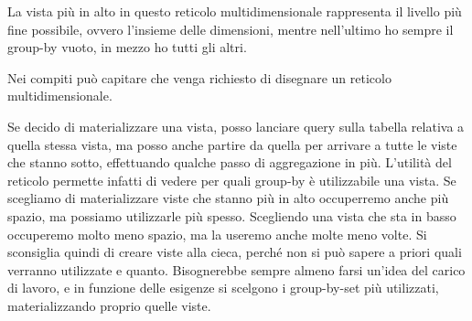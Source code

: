 \noindent La vista più in alto in questo reticolo multidimensionale rappresenta il livello più fine possibile, ovvero l'insieme delle dimensioni, mentre nell'ultimo ho sempre il group-by vuoto, in mezzo ho tutti gli altri.\newline
\begin{warn}
	Nei compiti può capitare che venga richiesto di disegnare un reticolo multidimensionale. 
\end{warn}
Se decido di materializzare una vista, posso lanciare query sulla tabella relativa a quella stessa vista, ma posso anche partire da quella per arrivare a tutte le viste che stanno sotto, effettuando qualche passo di aggregazione in più.\newline
L'utilità del reticolo permette infatti di vedere per quali group-by è utilizzabile una vista.\newline
Se scegliamo di materializzare viste che stanno più in alto occuperremo anche più spazio, ma possiamo utilizzarle più spesso. Scegliendo una vista che sta in basso occuperemo molto meno spazio, ma la useremo anche molte meno volte.\newline
Si sconsiglia quindi di creare viste alla cieca, perché non si può sapere a priori  quali verranno utilizzate e quanto. Bisognerebbe sempre almeno farsi un'idea del carico di lavoro, e in funzione delle esigenze si scelgono i group-by-set più utilizzati, materializzando proprio quelle viste.\newline
